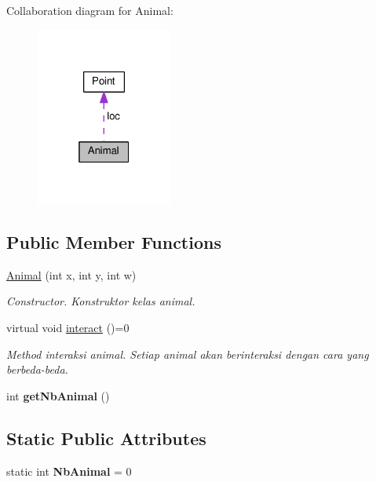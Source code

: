 Collaboration diagram for Animal\+:
\nopagebreak
\begin{figure}[H]
\begin{center}
\leavevmode
\includegraphics[width=127pt]{classAnimal__coll__graph}
\end{center}
\end{figure}
\subsection*{Public Member Functions}
\begin{DoxyCompactItemize}
\item 
\hyperlink{classAnimal_a38f8dc7a0844d03658f0cd5de482a5db}{Animal} (int x, int y, int w)\hypertarget{classAnimal_a38f8dc7a0844d03658f0cd5de482a5db}{}\label{classAnimal_a38f8dc7a0844d03658f0cd5de482a5db}

\begin{DoxyCompactList}\small\item\em Constructor. Konstruktor kelas animal. \end{DoxyCompactList}\item 
virtual void \hyperlink{classAnimal_af47626b050b665e9a19525227d2b840f}{interact} ()=0\hypertarget{classAnimal_af47626b050b665e9a19525227d2b840f}{}\label{classAnimal_af47626b050b665e9a19525227d2b840f}

\begin{DoxyCompactList}\small\item\em Method interaksi animal. Setiap animal akan berinteraksi dengan cara yang berbeda-\/beda. \end{DoxyCompactList}\item 
int {\bfseries get\+Nb\+Animal} ()\hypertarget{classAnimal_a654785ec6e23f33780711446eff77c81}{}\label{classAnimal_a654785ec6e23f33780711446eff77c81}

\end{DoxyCompactItemize}
\subsection*{Static Public Attributes}
\begin{DoxyCompactItemize}
\item 
static int {\bfseries Nb\+Animal} = 0\hypertarget{classAnimal_a828b89505d3cf5fee0e3042332a81e6e}{}\label{classAnimal_a828b89505d3cf5fee0e3042332a81e6e}

\end{DoxyCompactItemize}
